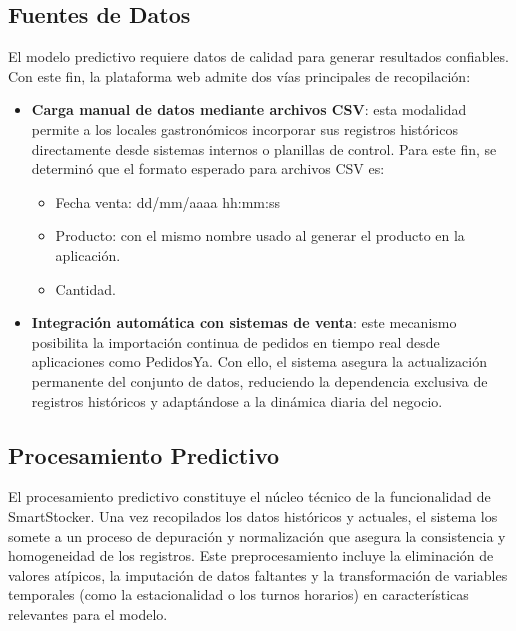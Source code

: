 \subsection{Fuentes de Datos}\label{sec:fuentes-datos}

El modelo predictivo requiere datos de calidad para generar resultados confiables. Con este fin, la plataforma web admite dos vías principales de recopilación:

\begin{itemize}
    \item \textbf{Carga manual de datos mediante archivos CSV}: esta modalidad permite a los locales gastronómicos incorporar sus registros históricos directamente desde sistemas internos o planillas de control. Para este fin, se determinó que el formato esperado para archivos CSV es:
    \begin{itemize}
        \item Fecha venta: dd/mm/aaaa hh:mm:ss
        \item Producto: con el mismo nombre usado al generar el producto en la aplicación.
        \item Cantidad.
    \end{itemize}

    \item \textbf{Integración automática con sistemas de venta}: este mecanismo posibilita la importación continua de pedidos en tiempo real desde aplicaciones como PedidosYa. Con ello, el sistema asegura la actualización permanente del conjunto de datos, reduciendo la dependencia exclusiva de registros históricos y adaptándose a la dinámica diaria del negocio.
\end{itemize}

\subsection{Procesamiento Predictivo}\label{sec:procesamiento-predictivo}

El procesamiento predictivo constituye el núcleo técnico de la funcionalidad de SmartStocker. Una vez recopilados los datos históricos y actuales, el sistema los somete a un proceso de depuración y normalización que asegura la consistencia y homogeneidad de los registros. Este preprocesamiento incluye la eliminación de valores atípicos, la imputación de datos faltantes y la transformación de variables temporales (como la estacionalidad o los turnos horarios) en características relevantes para el modelo.

